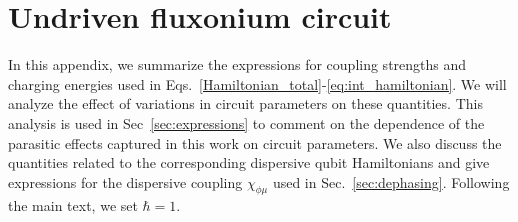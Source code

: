 \documentclass[%
reprint,
superscriptaddress,
 amsmath,amssymb,
 aps,
 prx,
longbibliography,
floatfix,
]{revtex4-2}
\begin{document}
\section{Undriven fluxonium circuit}\label{app:Hamiltonian}
In this appendix, we summarize the expressions for coupling strengths and charging energies used in Eqs.~\ref{Hamiltonian_total}-\ref{eq:int_hamiltonian}. We will analyze the effect of variations in circuit parameters on these quantities. This analysis is used in Sec~\ref{sec:expressions} to comment on the dependence of the parasitic effects captured in this work on circuit parameters. We also discuss the quantities related to the corresponding dispersive qubit Hamiltonians and give expressions for the dispersive coupling $\chi_{\phi\mu}$ used in Sec.~\ref{sec:dephasing}. Following the main text, we set $\hbar=1$. 
\end{document}
